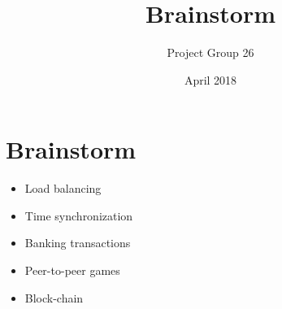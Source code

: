 \documentclass{article}
\title{Brainstorm}
\author{Project Group 26}
\date{April 2018}
\begin{document}
\maketitle

\section{Brainstorm}


\begin{itemize}
    \item Load balancing
    \item Time synchronization
    \item Banking transactions
    \item Peer-to-peer games
    \item Block-chain
\end{itemize}
\end{document}
